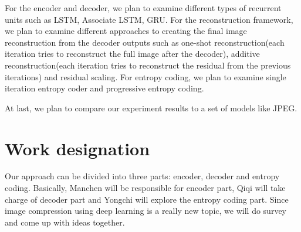 \documentclass[a4paper]{article}
\begin{document}
For the encoder and decoder, we plan to examine different types of recurrent units such as LSTM, Associate LSTM, GRU. For the reconstruction framework, we plan to examine different approaches to creating the final image reconstruction from the decoder outputs such as one-shot reconstruction(each iteration tries to reconstruct the full image after the decoder), additive reconstruction(each iteration tries to reconstruct the residual from the previous iterations) and residual scaling. For entropy coding, we plan to examine single iteration entropy coder and progressive entropy coding. 

At last, we plan to compare our experiment results to a set of models like JPEG.


\section{Work designation}

Our approach can be divided into three parts: encoder, decoder and entropy coding. Basically, Manchen will be responsible for encoder part, Qiqi will take charge of decoder part and Yongchi will explore the entropy coding part. Since image compression using deep learning is a really new topic, we will do survey and come up with ideas together.

\nocite{*}


\end{document}
